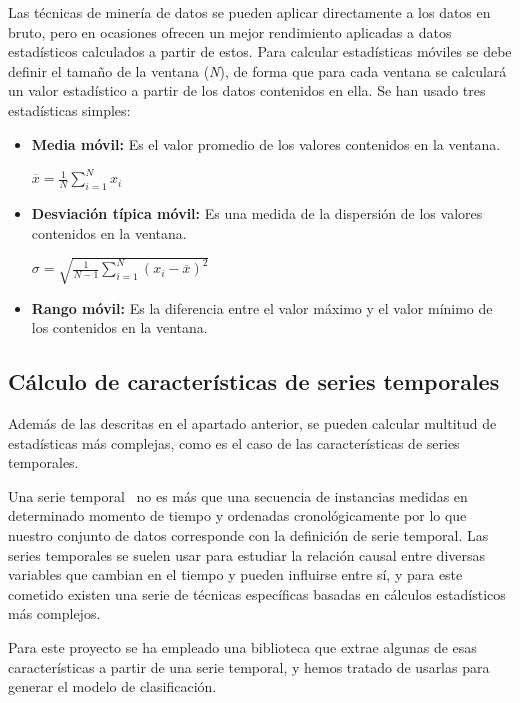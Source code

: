 Las técnicas de minería de datos se pueden aplicar directamente a los datos en bruto, pero en ocasiones ofrecen un mejor rendimiento aplicadas a datos estadísticos calculados a partir de estos. Para calcular estadísticas móviles se debe definir el tamaño de la ventana (\textit{N}), de forma que para cada ventana se calculará un valor estadístico a partir de los datos contenidos en ella. Se han usado tres estadísticas simples: 

\begin{itemize}
	\item \textbf{Media móvil:} Es el valor promedio de los valores contenidos en la ventana. 
	\begin{center}
		$ \overline{x}=\frac{1}{N}\sum_{i=1}^{N}x_{i}$
	\end{center}
	\item \textbf{Desviación típica móvil:} Es una medida de la dispersión de los valores contenidos en la ventana. 
	\begin{center}
		$ \sigma=\sqrt{\frac{1}{N-1}\sum_{i=1}^{N}(x_{i}-\overline{x})^2}$
	\end{center}
	\item \textbf{Rango móvil:} Es la diferencia entre el valor máximo y el valor mínimo de los contenidos en la ventana. 
\end{itemize}

\subsection{Cálculo de características de series temporales}

Además de las descritas en el apartado anterior, se pueden calcular multitud de estadísticas más complejas, como es el caso de las características de series temporales. 

Una serie temporal~\cite{wiki:serietemporal} no es más que una secuencia de instancias medidas en determinado momento de tiempo y ordenadas cronológicamente por lo que nuestro conjunto de datos corresponde con la definición de serie temporal. Las series temporales se suelen usar para estudiar la relación causal entre diversas variables que cambian en el tiempo y pueden influirse entre sí, y para este cometido existen una serie de técnicas específicas basadas en cálculos estadísticos más complejos. 

Para este proyecto se ha empleado una biblioteca que extrae algunas de esas características a partir de una serie temporal, y hemos tratado de usarlas para generar el modelo de clasificación. 

